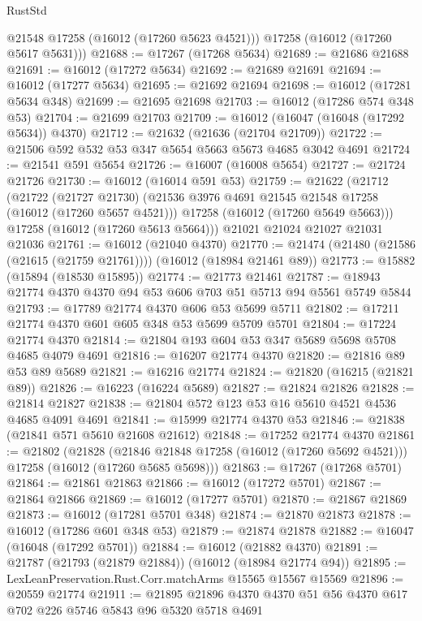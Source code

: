 \begin{lexlean}{RustStd}
\begin{coremodule}
        @21548
        @17258
        (@16012 (@17260 @5623 @4521)))
      @17258
      (@16012 (@17260 @5617 @5631)))
@21688 := @17267 (@17268 @5634)
@21689 := @21686 @21688
@21691 := @16012 (@17272 @5634)
@21692 := @21689 @21691
@21694 := @16012 (@17277 @5634)
@21695 := @21692 @21694
@21698 := @16012 (@17281 @5634 @348)
@21699 := @21695 @21698
@21703 := @16012 (@17286 @574 @348 @53)
@21704 := @21699 @21703
@21709 := @16012 (@16047 (@16048 (@17292 @5634)) @4370)
@21712 := @21632 (@21636 (@21704 @21709))
@21722 := @21506 @592 @532 @53 @347 @5654 @5663 @5673 @4685 @3042 @4691
@21724 := @21541 @591 @5654
@21726 := @16007 (@16008 @5654)
@21727 := @21724 @21726
@21730 := @16012 (@16014 @591 @53)
@21759 := @21622
    (@21712
      (@21722
        (@21727 @21730)
        (@21536 @3976 @4691 @21545 @21548 @17258 (@16012 (@17260 @5657 @4521)))
        @17258
        (@16012 (@17260 @5649 @5663)))
      @17258
      (@16012 (@17260 @5613 @5664)))
    @21021
    @21024
    @21027
    @21031
    @21036
@21761 := @16012 (@21040 @4370)
@21770 := @21474 (@21480 (@21586 (@21615 (@21759 @21761)))) (@16012 (@18984 @21461 @89))
@21773 := @15882 (@15894 (@18530 @15895))
@21774 := @21773 @21461
@21787 := @18943 @21774 @4370 @4370 @94 @53 @606 @703 @51 @5713 @94 @5561 @5749 @5844
@21793 := @17789 @21774 @4370 @606 @53 @5699 @5711
@21802 := @17211 @21774 @4370 @601 @605 @348 @53 @5699 @5709 @5701
@21804 := @17224 @21774 @4370
@21814 := @21804 @193 @604 @53 @347 @5689 @5698 @5708 @4685 @4079 @4691
@21816 := @16207 @21774 @4370
@21820 := @21816 @89 @53 @89 @5689
@21821 := @16216 @21774
@21824 := @21820 (@16215 (@21821 @89))
@21826 := @16223 (@16224 @5689)
@21827 := @21824 @21826
@21828 := @21814 @21827
@21838 := @21804 @572 @123 @53 @16 @5610 @4521 @4536 @4685 @4091 @4691
@21841 := @15999 @21774 @4370 @53
@21846 := @21838 (@21841 @571 @5610 @21608 @21612)
@21848 := @17252 @21774 @4370
@21861 := @21802
    (@21828
      (@21846 @21848 @17258 (@16012 (@17260 @5692 @4521)))
      @17258
      (@16012 (@17260 @5685 @5698)))
@21863 := @17267 (@17268 @5701)
@21864 := @21861 @21863
@21866 := @16012 (@17272 @5701)
@21867 := @21864 @21866
@21869 := @16012 (@17277 @5701)
@21870 := @21867 @21869
@21873 := @16012 (@17281 @5701 @348)
@21874 := @21870 @21873
@21878 := @16012 (@17286 @601 @348 @53)
@21879 := @21874 @21878
@21882 := @16047 (@16048 (@17292 @5701))
@21884 := @16012 (@21882 @4370)
@21891 := @21787 (@21793 (@21879 @21884)) (@16012 (@18984 @21774 @94))
@21895 := LexLeanPreservation.Rust.Corr.matchArms @15565 @15567 @15569
@21896 := @20559 @21774
@21911 := @21895 @21896 @4370 @4370 @51 @56 @4370 @617 @702 @226 @5746 @5843 @96 @5320 @5718 @4691

\end{coremodule}
\end{lexlean}
